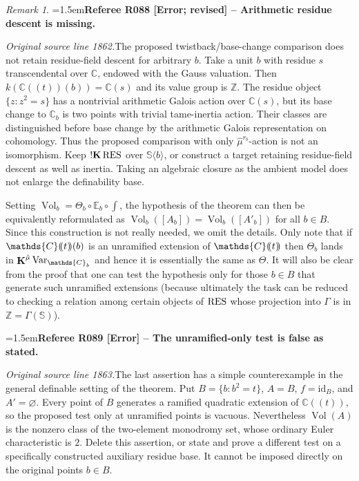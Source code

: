 \documentclass[12pt]{amsart}
\newcommand{\RefereeRemark}[4]{%
  \par\medskip\begingroup\normalfont\small\color{RefereePurple}%
  \emergencystretch=1.5em\noindent\textbf{Referee R#1 [#2] -- #3.}\par\nobreak\noindent #4\par
  \endgroup\medskip
}
\theoremstyle{plain}
\theoremstyle{definition}
\theoremstyle{remark}
\newtheorem{rem}[thm]{Remark}
\numberwithin{equation}{section}
\theoremstyle{plain}
\newcommand{\Z}{\mathds{Z}}
\newcommand{\C}{\mathds{C}}
\newcommand{\0}{\emptyset}
\newcommand{\dpar}[1]{%
   (\mkern-4mu (#1 )\mkern-4mu )}
\newcommand{\bb}[1]{\mathbb{#1}}
\newcommand{\RES}{\textup{RES}}
\DeclareMathOperator{\ggk}{\mathbf{K}}
\DeclareMathOperator{\sggk}{!\mathbf{K}}
\newcommand{\var}{\textup{Var}}
\DeclareMathOperator{\Vol}{Vol}
\begin{document}
\begin{rem}
\RefereeRemark{088}{Error; revised}{Arithmetic residue descent is missing}{%
\textit{Original source line 1862.}\quad The proposed twistback/base-change comparison does not retain residue-field descent for arbitrary $b$. Take a unit $b$ with residue $s$ transcendental over $\mathbb C$, endowed with the Gauss valuation. Then $k(\mathbb C((t))(b))=\mathbb C(s)$ and its value group is $\mathbb Z$. The residue object $\{z:z^2=s\}$ has a nontrivial arithmetic Galois action over $\mathbb C(s)$, but its base change to $\mathbb C_b$ is two points with trivial tame-inertia action. Their classes are distinguished before base change by the arithmetic Galois representation on cohomology. Thus the proposed comparison with only $\hat\mu^{r_b}$-action is not an isomorphism. Keep $\sggk\RES$ over $\mathbb S\langle b\rangle$, or construct a target retaining residue-field descent as well as inertia. Taking an algebraic closure as the ambient model does not enlarge the definability base.
}
Setting $\Vol_b = \Theta_b \circ \bb E_b \circ \int$, the hypothesis of the theorem can then be equivalently reformulated as  $\Vol_b([A_b]) = \Vol_b([A'_b])$ for all $b \in B$. Since this construction is not really needed, we omit the details. Only note that if $\C \dpar{ t }( b )$ is an unramified extension of $\C \dpar{ t }$ then $\Theta_b$ lands in $\ggk^{{\hat \mu}}\var_{\C_b}$ and hence it is essentially the same as $\Theta$. It will also be clear from the proof that one can test the hypothesis only for those $b \in B$ that generate such unramified extensions (because ultimately the task can be reduced to checking a relation among certain objects of $\RES$ whose projection into $\Gamma$ is in $\Z = \Gamma(\bb S)$).

\RefereeRemark{089}{Error}{The unramified-only test is false as stated}{%
\textit{Original source line 1863.}\quad The last assertion has a simple counterexample in the general definable setting of the theorem. Put $B=\{b:b^2=t\}$, $A=B$, $f=\mathrm{id}_B$, and $A'=\varnothing$. Every point of $B$ generates a ramified quadratic extension of $\mathbb C((t))$, so the proposed test only at unramified points is vacuous. Nevertheless $\operatorname{Vol}(A)$ is the nonzero class of the two-element monodromy set, whose ordinary Euler characteristic is $2$. Delete this assertion, or state and prove a different test on a specifically constructed auxiliary residue base. It cannot be imposed directly on the original points $b\in B$.
}
\end{rem}
\end{document}
